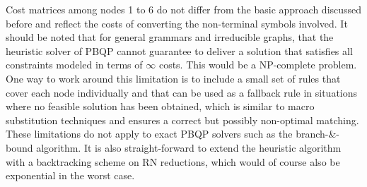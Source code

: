 Cost matrices among nodes 1 to 6 do not differ from the basic
approach discussed before and reflect the costs of converting the
non-terminal symbols involved.  It should be noted that for general
grammars and irreducible graphs, that the heuristic solver of PBQP
cannot guarantee to deliver a solution that satisfies all constraints
modeled in terms of $\infty$ costs. This would be a NP-complete
problem. One way to work around this limitation is to include a small
set of rules that cover each node individually and that can be used as
a fallback rule in situations where no feasible solution has been
obtained, which is similar to macro substitution techniques and
ensures a correct but possibly non-optimal matching. These limitations
do not apply to exact PBQP solvers such as the branch-\&-bound
algorithm. It is also straight-forward to extend the heuristic
algorithm with a backtracking scheme on RN reductions, which would of
course also be exponential in the worst case.



